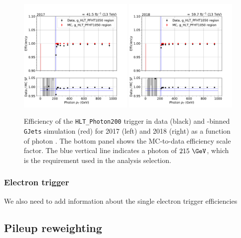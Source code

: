 \begin{figure}[hbtp]\begin{center}
    \includegraphics[width=0.49\textwidth]{fig/efficiency/trigger/photon/data_mc_comparison_g_HLT_PFHT1050_2017.pdf}
    \includegraphics[width=0.49\textwidth]{fig/efficiency/trigger/photon/data_mc_comparison_g_HLT_PFHT1050_2018.pdf}
    \caption{Efficiency of the \texttt{HLT\_Photon200} trigger in data (black) and \HT-binned \texttt{GJets} simulation (red) for 2017 (left) and 2018 (right) as a function of photon \pt. The bottom panel shows the MC-to-data efficiency scale factor. The blue vertical line indicates a photon \pt of $215~\GeV$, which is the requirement used in the analysis selection.}
    \label{fig:hlteff_photon}
 \end{center}\end{figure}

\subsubsection{Electron trigger}
{\color{red} We also need to add information about the single electron trigger efficiencies}

\subsection{Pileup reweighting}

